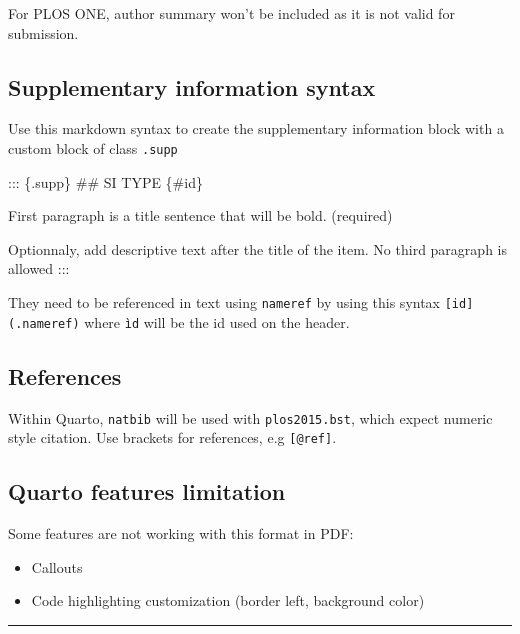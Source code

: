 \documentclass[
  10pt,
  letterpaper,
]{article}
\newenvironment{Shaded}{\begin{snugshade}}{\end{snugshade}}
\newcommand{\FunctionTok}[1]{\textcolor[rgb]{0.28,0.35,0.67}{#1}}
\newcommand{\NormalTok}[1]{\textcolor[rgb]{0.00,0.23,0.31}{#1}}
\providecommand{\tightlist}{%
  \setlength{\itemsep}{0pt}\setlength{\parskip}{0pt}}\usepackage{longtable,booktabs,array}
\begin{document}
For PLOS ONE, author summary won't be included as it is not valid for
submission.

\subsection{Supplementary information
syntax}\label{supplementary-information-syntax}

Use this markdown syntax to create the supplementary information block
with a custom block of class \texttt{.supp}

\begin{Shaded}
\begin{Highlighting}[]
\NormalTok{::: \{.supp\}}
\FunctionTok{\#\# SI TYPE \{\#id\}}

\NormalTok{First paragraph is a title sentence that will be bold. (required)}

\NormalTok{Optionnaly, add descriptive text after the title of the}
\NormalTok{item. No third paragraph is allowed}
\NormalTok{:::}
\end{Highlighting}
\end{Shaded}

They need to be referenced in text using \texttt{nameref} by using this
syntax \texttt{{[}id{]}(.nameref)} where \texttt{ìd} will be the id used
on the header.

\subsection{References}\label{references}

Within Quarto, \texttt{natbib} will be used with \texttt{plos2015.bst},
which expect numeric style citation. Use brackets for references, e.g
\texttt{{[}@ref{]}}.

\subsection{Quarto features
limitation}\label{quarto-features-limitation}

Some features are not working with this format in PDF:

\begin{itemize}
\tightlist
\item
  Callouts
\item
  Code highlighting customization (border left, background color)
\end{itemize}

\begin{center}\rule{0.5\linewidth}{0.5pt}\end{center}
\end{document}
